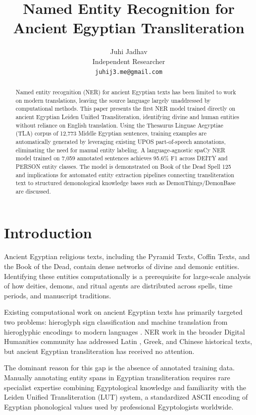 \documentclass[11pt]{article}
\title{Named Entity Recognition for Ancient Egyptian Transliteration}
\author{
    Juhi Jadhav \\
    Independent Researcher \\
    \texttt{juhij3.me@gmail.com}
}
\date{}
\begin{document}
\maketitle

\begin{abstract}
Named entity recognition (NER) for ancient Egyptian texts has been limited to work on modern translations, leaving the source language largely unaddressed by computational methods. This paper presents the first NER model trained directly on ancient Egyptian Leiden Unified Transliteration, identifying divine and human entities without reliance on English translation. Using the Thesaurus Linguae Aegyptiae (TLA) corpus of 12,773 Middle Egyptian sentences, training examples are automatically generated by leveraging existing UPOS part-of-speech annotations, eliminating the need for manual entity labeling. A language-agnostic spaCy NER model trained on 7,059 annotated sentences achieves 95.6\% F1 across DEITY and PERSON entity classes. The model is demonstrated on Book of the Dead Spell 125 and implications for automated entity extraction pipelines connecting transliteration text to structured demonological knowledge bases such as DemonThings/DemonBase are discussed.
\end{abstract}

\section{Introduction}

Ancient Egyptian religious texts, including the Pyramid Texts, Coffin Texts, and the Book of the Dead, contain dense networks of divine and demonic entities. Identifying these entities computationally is a prerequisite for large-scale analysis of how deities, demons, and ritual agents are distributed across spells, time periods, and manuscript traditions.

Existing computational work on ancient Egyptian texts has primarily targeted two problems: hieroglyph sign classification \cite{barucci2021,franken2013} and machine translation from hieroglyphic encodings to modern languages \cite{hieroglyphic2024}. NER work in the broader Digital Humanities community has addressed Latin \cite{romanello2023}, Greek, and Chinese historical texts, but ancient Egyptian transliteration has received no attention.

The dominant reason for this gap is the absence of annotated training data. Manually annotating entity spans in Egyptian transliteration requires rare specialist expertise combining Egyptological knowledge and familiarity with the Leiden Unified Transliteration (LUT) system, a standardized ASCII encoding of Egyptian phonological values used by professional Egyptologists worldwide.
\end{document}
